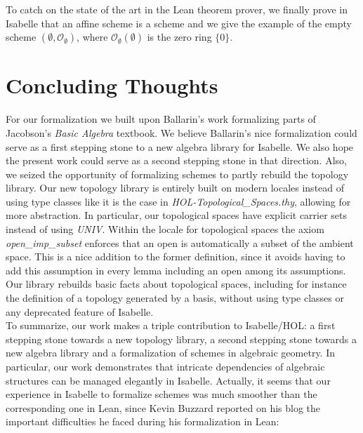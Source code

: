 \documentclass[12pt]{scrartcl}
\begin{document}
To catch on the state of the art in the Lean theorem prover, we finally prove in Isabelle that an affine scheme is a scheme and we give the example of the empty scheme $(\emptyset, \mathscr{O}_\emptyset)$, where $\mathscr{O}_\emptyset(\emptyset)$ is the zero ring $\lbrace 0 \rbrace$. 



\section{Concluding Thoughts}

For our formalization we built upon Ballarin's work \cite{ballarin20} formalizing parts of Jacobson's \textit{Basic Algebra} textbook. We believe Ballarin's nice formalization could serve as a first stepping stone to a new algebra library for Isabelle. We also hope the present work could serve as a second stepping stone in that direction. Also, we seized the opportunity of formalizing schemes to partly rebuild the topology library. Our new topology library is entirely built on modern locales instead of using type classes like it is the case in \textit{HOL-Topological\_Spaces.thy}, allowing for more abstraction. In particular, our topological spaces have explicit carrier sets instead of using \textit{UNIV}. 
Within the locale for topological spaces the axiom \textit{open\_imp\_subset} enforces that an open is automatically a subset of the ambient space. This is a nice addition to the former definition, since it avoids having to add this assumption in every lemma including an open among its assumptions. Our library rebuilds basic facts about topological spaces, including for instance the definition of a topology generated by a basis, without using type classes or any deprecated feature of Isabelle. 
\\
To summarize, our work makes a triple contribution to Isabelle/HOL: a first stepping stone towards a new topology library, a second stepping stone towards a new algebra library and a formalization of schemes in algebraic geometry. In particular, our work demonstrates that intricate dependencies of algebraic structures can be managed elegantly in Isabelle. 
Actually, it seems that our experience in Isabelle to formalize schemes was much smoother than the corresponding one in Lean, since Kevin Buzzard reported on his blog the important difficulties he faced during his formalization in Lean:
\end{document}
